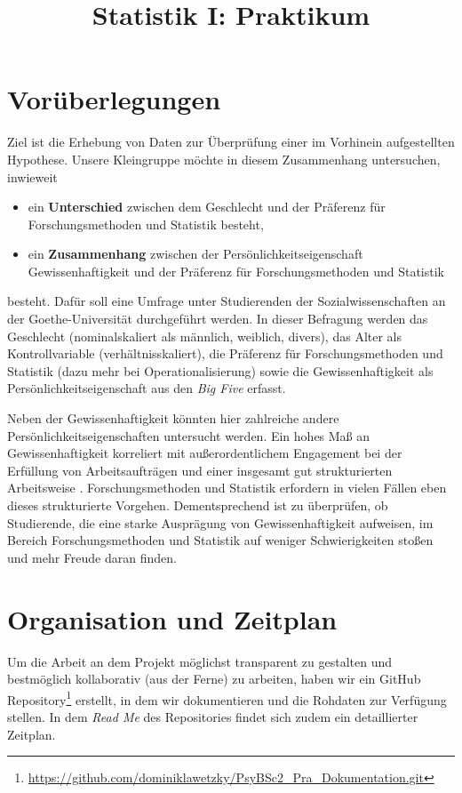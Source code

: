 \documentclass[doc]{apa7}
\title{Statistik I: Praktikum}
\begin{document}
\maketitle

\section{Vorüberlegungen}
Ziel ist die Erhebung von Daten zur Überprüfung einer im Vorhinein aufgestellten Hypothese. Unsere Kleingruppe möchte in diesem Zusammenhang untersuchen, inwieweit
\begin{itemize}
    \item ein \textbf{Unterschied} zwischen dem Geschlecht und der Präferenz für Forschungsmethoden und Statistik besteht,
    \item ein \textbf{Zusammenhang} zwischen der Persönlichkeitseigenschaft Gewissenhaftigkeit und der Präferenz für Forschungsmethoden und Statistik
\end{itemize}
besteht. Dafür soll eine Umfrage unter Studierenden der Sozialwissenschaften an der Goethe-Universität durchgeführt werden. In dieser Befragung werden das Geschlecht (nominalskaliert als männlich, weiblich, divers), das Alter als Kontrollvariable (verhältnisskaliert), die Präferenz für Forschungsmethoden und Statistik (dazu mehr bei Operationalisierung) sowie die Gewissenhaftigkeit als Persönlichkeitseigenschaft aus den \textit{Big Five} erfasst. 

Neben der Gewissenhaftigkeit könnten hier zahlreiche andere Persönlichkeitseigenschaften untersucht werden. Ein hohes Maß an Gewissenhaftigkeit korreliert mit außerordentlichem Engagement bei der Erfüllung von Arbeitsaufträgen und einer insgesamt gut strukturierten Arbeitsweise \autocite{jackson_what_2010}. Forschungsmethoden und Statistik erfordern in vielen Fällen eben dieses strukturierte Vorgehen. Dementsprechend ist zu überprüfen, ob Studierende, die eine starke Ausprägung von Gewissenhaftigkeit aufweisen, im Bereich Forschungsmethoden und Statistik auf weniger Schwierigkeiten stoßen und mehr Freude daran finden.

\section{Organisation und Zeitplan}
Um die Arbeit an dem Projekt möglichst transparent zu gestalten und bestmöglich kollaborativ (aus der Ferne) zu arbeiten, haben wir ein GitHub Repository\footnote{\url{https://github.com/dominiklawetzky/PsyBSc2_Pra_Dokumentation.git}} erstellt, in dem wir dokumentieren und die Rohdaten zur Verfügung stellen. In dem \textit{Read Me} des Repositories findet sich zudem ein detaillierter Zeitplan.
\end{document}
